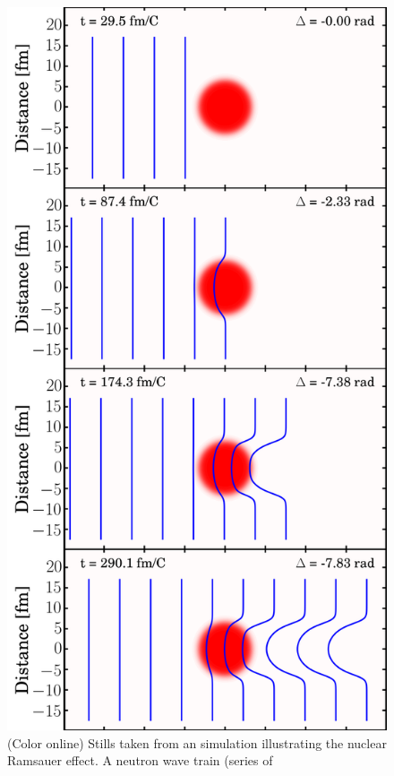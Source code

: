 \documentclass[twocolumn,secnumarabic,amssymb, nobibnotes, aps, prl,
superscriptaddress, nobalancelastpage]{revtex4}
\begin{document}
\begin{figure}
    \hfill\begin{minipage}{0.5\textwidth}\centering
        \includegraphics[scale=0.2]{figures/phaseShiftStillsFigure.png}
        \caption{(Color online) Stills taken from an simulation illustrating the nuclear 
            Ramsauer effect. A neutron wave train (series of
}
\end{minipage}
\end{figure}
\end{document}
